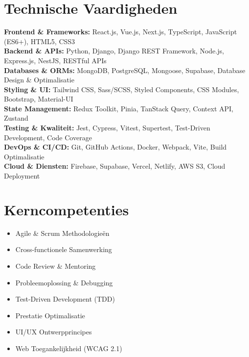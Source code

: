 \documentclass[10pt,a4paper]{article}
\begin{document}
\section*{Technische Vaardigheden}

\noindent
\textbf{\color{darkgray}Frontend \& Frameworks:} React.js, Vue.js, Next.js, TypeScript, JavaScript (ES6+), HTML5, CSS3 \\
\textbf{\color{darkgray}Backend \& APIs:} Python, Django, Django REST Framework, Node.js, Express.js, NestJS, RESTful APIs \\
\textbf{\color{darkgray}Databases \& ORMs:} MongoDB, PostgreSQL, Mongoose, Supabase, Database Design \& Optimalisatie \\
\textbf{\color{darkgray}Styling \& UI:} Tailwind CSS, Sass/SCSS, Styled Components, CSS Modules, Bootstrap, Material-UI \\
\textbf{\color{darkgray}State Management:} Redux Toolkit, Pinia, TanStack Query, Context API, Zustand \\
\textbf{\color{darkgray}Testing \& Kwaliteit:} Jest, Cypress, Vitest, Supertest, Test-Driven Development, Code Coverage \\
\textbf{\color{darkgray}DevOps \& CI/CD:} Git, GitHub Actions, Docker, Webpack, Vite, Build Optimalisatie \\
\textbf{\color{darkgray}Cloud \& Diensten:} Firebase, Supabase, Vercel, Netlify, AWS S3, Cloud Deployment

\section*{Kerncompetenties}

\noindent
\begin{minipage}[t]{0.48\textwidth}
  \begin{itemize}
    \item Agile \& Scrum Methodologieën
    \item Cross-functionele Samenwerking
    \item Code Review \& Mentoring
    \item Probleemoplossing \& Debugging
  \end{itemize}
\end{minipage}%
\hfill
\begin{minipage}[t]{0.48\textwidth}
  \begin{itemize}
    \item Test-Driven Development (TDD)
    \item Prestatie Optimalisatie
    \item UI/UX Ontwerpprincipes
    \item Web Toegankelijkheid (WCAG 2.1)
  \end{itemize}
\end{minipage}
\end{document}
